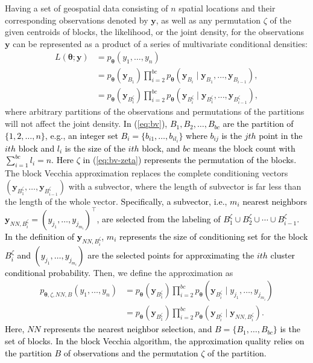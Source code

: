 \documentclass[12pt]{article}
\begin{document}
Having a set of geospatial data consisting of $n$ spatial locations and their corresponding observations denoted by $\boldsymbol{y}$, as well as any permutation $\zeta$ of the given centroids of blocks, the likelihood, or the joint density, for the observations $\boldsymbol{y}$ can be represented as a product of a series of multivariate conditional densities:
\begin{align}
    L({\boldsymbol\theta};\boldsymbol{y}) &= p_{\boldsymbol\theta}\left(y_1, \ldots, y_n\right) \nonumber \\
    & = p_{\boldsymbol\theta}\left(\boldsymbol{y}_{B_1}\right) \prod_{i=2}^{bc} p_{\boldsymbol\theta}\left(\boldsymbol{y}_{B_i} \mid \boldsymbol{y}_{B_1}, \ldots,\boldsymbol{y}_{B_{i-1}}\right) \label{eq:bv}, \\
    & = p_{\boldsymbol\theta}\left(\boldsymbol{y}_{B^\zeta_1}\right) \prod_{i=2}^{bc} p_{\boldsymbol\theta}\left(\boldsymbol{y}_{B^\zeta_i} \mid \boldsymbol{y}_{B^\zeta_1}, \ldots,\boldsymbol{y}_{B^\zeta_{i-1}}\right) \label{eq:bv-zeta},    
\end{align}
where arbitrary partitions of the observations and permutations of the partitions will not affect the joint density. \textcolor{black}{In (\ref{eq:bv}), $B_1, B_2, \ldots, B_{bc}$ are the partition of $\{1, 2, \ldots, n\}$, e.g., an integer set $B_i = \{b_{i1}, \ldots, b_{il_i}\}$  \textcolor{black}{where $b_{ij}$ is the $jth$ point in the $ith$ block and $l_i$ is the size of the $ith$ block}, and $bc$ means the block count with $\sum_{i=1}^{bc} l_{i} = n$. Here $\zeta$ in (\ref{eq:bv-zeta}) represents the permutation of the blocks.} The block Vecchia approximation replaces the complete conditioning vectors $(\boldsymbol{y}_{B^\zeta_1}, \ldots,\boldsymbol{y}_{B^\zeta_{i-1}} )$ with a subvector, where the length of subvector is far less than the length of the whole vector. 
\textcolor{black}{Specifically, a subvector, i.e., $m_i$ nearest neighbors $\boldsymbol{y}_{NN, B^{\zeta}_i} = (y_{j_1}, \ldots, y_{j_{m_i}})^\top$, are selected from the labeling of $B^\zeta_1 \cup B^\zeta_2 \cup \cdots \cup B^\zeta_{i-1}$. In the definition of $\boldsymbol{y}_{NN, B^{\zeta}_i}$, $m_i$ represents the size of conditioning set for the block $B^\zeta_i$ and $(y_{j_1}, \ldots, y_{j_{m_i}})$ are the selected points for approximating the $ith$ cluster conditional probability. 
} Then, we define the approximation as 
\begin{align}
    p_{\boldsymbol\theta,  \zeta, NN, B}\left(y_1, \ldots, y_n\right)
    &=
    p_{\boldsymbol\theta}\left(\boldsymbol{y}_{B^\zeta_1}\right) \prod_{i=2}^{bc}
    p_{\boldsymbol\theta}\left(\boldsymbol{y}_{B^\zeta_i}\mid y_{j_1}, \ldots, y_{j_{m_i}}\right) \nonumber \\
    &= 
    p_{\boldsymbol\theta}\left(\boldsymbol{y}_{B^\zeta_1}\right) \prod_{i=2}^{bc} p_{\boldsymbol\theta}\left(\boldsymbol{y}_{B^\zeta_i} \mid \boldsymbol{y}_{NN, B^{\zeta}_i} \right).\label{eq:vecchia-vector}
\end{align}
\textcolor{black}{
Here, $NN$ represents the nearest neighbor selection, and $B = \{B_1, \ldots, B_{bc}\}$ is the set of blocks. In the block Vecchia algorithm, the approximation quality relies on the partition $B$ of observations and the permutation $\zeta$ of the partition. 
}
\end{document}
